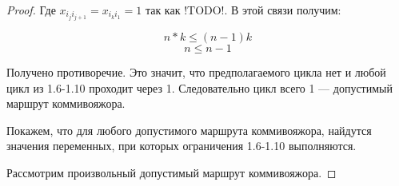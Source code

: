 \documentclass[../../main.tex]{subfiles}
\begin{document}
\begin{example}
\begin{proof}
        Где $x_{i_ji_{j+1}}=x_{i_ki_1}=1$ так как !TODO!. В этой связи
        получим:

        \begin{equation*}
            n * k \le (n-1)k
        \end{equation*}
        \begin{equation*}
            n \le n - 1
        \end{equation*}

        Получено противоречие. Это значит, что предполагаемого цикла нет и
        любой цикл из 1.6-1.10 проходит через 1. Следовательно цикл всего 1
        --- допустимый маршрут коммивояжора.

        Покажем, что для любого допустимого маршрута коммивояжора, найдутся
        значения переменных, при которых ограничения 1.6-1.10 выполняются.

        Рассмотрим произвольный допустимый маршрут коммивояжора.


    \end{proof}




\end{example}
\end{document}
